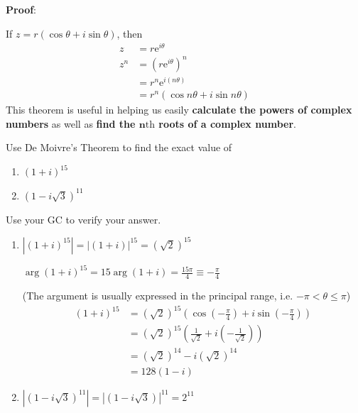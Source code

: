 \documentclass[11pt,a4paper]{book}
\begin{document}
\textbf{Proof}:

If $z=r\left(\cos\theta+i\sin\theta\right)$, then
\begin{align*}
z & =r\mathrm{e}^{i\theta}\\
z^{n} & =\left(r\mathrm{e}^{i\theta}\right)^{n}\\
 & =r^{n}\mathrm{e}^{i\left(n\theta\right)}\\
 & =r^{n}\left(\cos n\theta+i\sin n\theta\right)
\end{align*}
This theorem is useful in helping us easily \textbf{calculate the
powers of complex numbers} as well as \textbf{find the $\textbf{n}\text{th}$
roots of a complex number}.

\begin{example}

Use De Moivre's Theorem to find the exact value of

\begin{enumerate}[label=(\alph*)]

\item  $\left(1+i\right)^{15}$

\item  $\left(1-i\sqrt{3}\right)^{11}$

\end{enumerate}

Use your GC to verify your answer.

\Solution

\begin{enumerate}[label=(\alph*)]

\item  $\left|\left(1+i\right)^{15}\right|=\left|\left(1+i\right)\right|^{15}=\left(\sqrt{2}\right)^{15}$

${\displaystyle \arg\left(1+i\right)^{15}=15\arg\left(1+i\right)=\frac{15\pi}{4}\equiv-\frac{\pi}{4}}$

(The argument is usually expressed in the principal range, i.e. $-\pi<\theta\leq\pi$)
\begin{align*}
\left(1+i\right)^{15} & =\left(\sqrt{2}\right)^{15}\left(\cos\left(-\frac{\pi}{4}\right)+i\sin\left(-\frac{\pi}{4}\right)\right)\\
 & =\left(\sqrt{2}\right)^{15}\left(\frac{1}{\sqrt{2}}+i\left(-\frac{1}{\sqrt{2}}\right)\right)\\
 & =\left(\sqrt{2}\right)^{14}-i\left(\sqrt{2}\right)^{14}\\
 & =128\left(1-i\right)
\end{align*}

\item  $\left|\left(1-i\sqrt{3}\right)^{11}\right|=\left|\left(1-i\sqrt{3}\right)\right|^{11}=2^{11}$


\end{enumerate}
\end{example}
\end{document}
